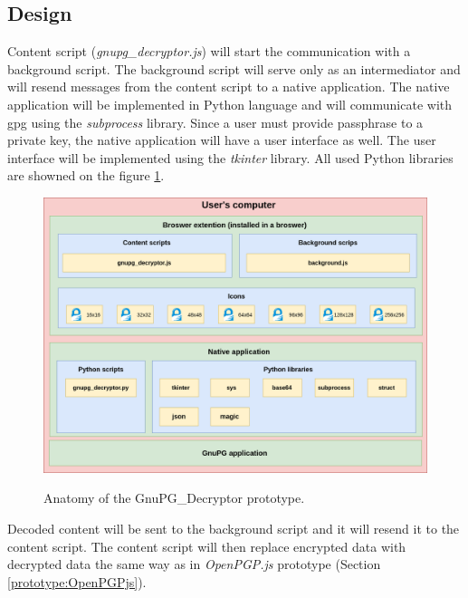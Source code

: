 \subsection{Design}
Content script (\textit{gnupg\_decryptor.js}) will start the communication with a background script. The background script will serve only as an intermediator and will resend messages from the content script to a native application. The native application will be implemented in Python language and will communicate with gpg using the \textit{subprocess} library. Since a user must provide passphrase to a private key, the native application will have a user interface as well. The user interface will be implemented using the \textit{tkinter} library. All used Python libraries are showned on the figure \ref{img:gnupg_decryptorAnatomy}.

\begin{figure}[H]
    \begin{center}
        \label{img:gnupg_decryptorAnatomy}
        \includegraphics[width=1.0\textwidth]{obrazky-figures/prototype-GnuPG_Decryptor.png}
        \caption{Anatomy of the GnuPG\_Decryptor prototype.}
    \end{center}
\end{figure}

Decoded content will be sent to the background script and it will resend it to the content script. The content script will then replace encrypted data with decrypted data the same way as in \textit{OpenPGP.js} prototype (Section \ref{prototype:OpenPGPjs}).

